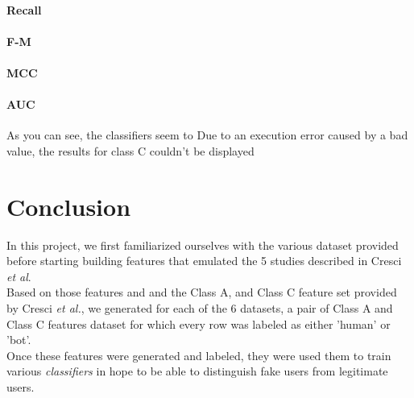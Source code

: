 \documentclass[a4paper,11pt]{article}
\begin{document}
	\paragraph{Recall}
	
	\paragraph{F-M}
	
	\paragraph{MCC}
	
	\paragraph{AUC}
	
	As you can see, the classifiers seem to 
	Due to an execution error caused by a bad value, the results for class C couldn't be displayed
	
\section{Conclusion}
In this project, we first familiarized ourselves with the various dataset provided before starting building features that emulated the 5 studies described in Cresci \textit{et al}. \\
Based on those features and and the Class A, and Class C feature set provided by Cresci \textit{et al.}, we generated for each of the 6 datasets, a pair of Class A and Class C features dataset for which every row was labeled as either 'human' or 'bot'.\\
Once these features were generated and labeled, they were used them to train various \textit{classifiers} in hope to be able to distinguish fake users from legitimate users.



\end{document}
